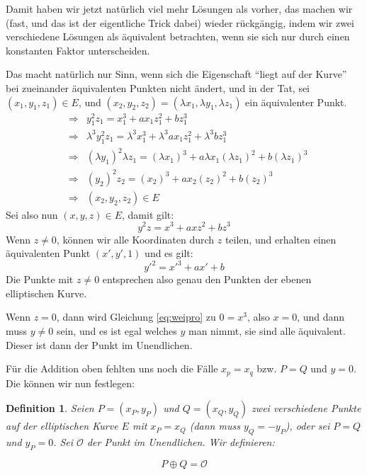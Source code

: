 \documentclass{article}
\newcounter{thm}
\newtheorem{definition}[thm]{Definition}
\begin{document}
Damit haben wir jetzt natürlich viel mehr Lösungen als vorher, das machen wir
(fast, und das ist der eigentliche Trick dabei) wieder rückgängig, indem wir
zwei verschiedene Lösungen als äquivalent betrachten, wenn sie sich nur durch
einen konstanten Faktor unterscheiden.

Das macht natürlich nur Sinn, wenn sich die Eigenschaft ``liegt auf der Kurve''
bei zueinander äquivalenten Punkten nicht ändert, und in der Tat,
sei $(x_1, y_1, z_1) \in E$, und
$(x_2, y_2, z_2) = (\lambda x_1, \lambda y_1, \lambda z_1)$ ein äquivalenter
Punkt.
\begin{eqnarray*}
    & \Rightarrow &
    y_1^2 z_1 = x_1^3 + a x_1 z_1^2 + b z_1^3 \\
    & \Rightarrow &
    \lambda^3 y_1^2 z_1
    = \lambda^3 x_1^3 + \lambda^3 a x_1 z_1^2 + \lambda^3 b z_1^3 \\
    & \Rightarrow &
    (\lambda y_1)^2 \lambda z_1 = (\lambda x_1)^3
    + a \lambda x_1 (\lambda z_1)^2 + b (\lambda z_1)^3 \\
    & \Rightarrow &
    (y_2)^2 z_2 = (x_2)^3
    + a x_2 (z_2)^2 + b (z_2)^3 \\
    & \Rightarrow & (x_2, y_2, z_2) \in E
\end{eqnarray*}
Sei also nun $(x, y, z) \in E$, damit gilt:
\begin{equation} \label{eq:weipro}
  y^2z = x^3 + a xz^2 + b z^3
\end{equation}
Wenn $z\ne 0$, können wir alle Koordinaten durch $z$ teilen, und erhalten
einen äquivalenten Punkt $(x', y', 1)$ und es gilt:
$$ {y'}^2 = {x'}^3 + ax' + b$$
Die Punkte mit $z \ne 0$ entsprechen also genau den Punkten der ebenen
elliptischen Kurve.

Wenn $z = 0$, dann wird Gleichung \eqref{eq:weipro} zu $0 = x^3$, also
$x = 0$, und dann muss $y \ne 0$ sein, und es ist egal welches $y$ man nimmt,
sie sind alle äquivalent. Dieser ist dann der Punkt im Unendlichen.

Für die Addition oben fehlten uns noch die Fälle $x_p = x_q$ bzw. $P=Q$ und
$y=0$. Die können wir nun festlegen:

  \begin{definition}
    Seien $P = (x_P, y_P)$ und $Q =(x_Q, y_Q)$ zwei verschiedene Punkte auf der
    elliptischen Kurve $E$ mit $x_P = x_Q$ (dann muss $y_Q = -y_P$),
    oder sei $P = Q$ und $y_P = 0$.
    Sei $\mathcal{O}$ der Punkt im Unendlichen. Wir definieren:

    $$ P \oplus Q = \mathcal{O} $$
  \end{definition}
\end{document}
